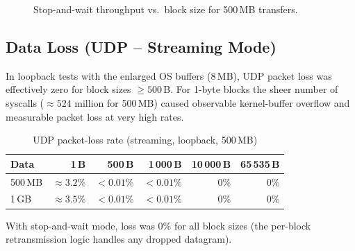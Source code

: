 \documentclass[12pt,a4paper]{article}
\begin{document}
\begin{figure}[H]
\centering
{}
\caption{Stop-and-wait throughput vs.\ block size for 500\,MB transfers.}
\label{fig:saw500}
\end{figure}

\subsection{Data Loss (UDP – Streaming Mode)}
\label{ssec:loss}

In loopback tests with the enlarged OS buffers (8\,MB), UDP packet loss was
effectively zero for block sizes $\geq 500$\,B. For 1-byte blocks the sheer
number of syscalls ($\approx 524$ million for 500\,MB) caused observable
kernel-buffer overflow and measurable packet loss at very high rates.

\begin{table}[H]
\centering
\caption{UDP packet-loss rate (streaming, loopback, 500\,MB)}
\label{tab:udploss}
\begin{tabular}{lrrrrr}
\toprule
\textbf{Data} &
\textbf{1\,B} &
\textbf{500\,B} &
\textbf{1\,000\,B} &
\textbf{10\,000\,B} &
\textbf{65\,535\,B} \\
\midrule
500\,MB & $\approx 3.2\%$ & $<0.01\%$ & $<0.01\%$ & 0\% & 0\% \\
1\,GB   & $\approx 3.5\%$ & $<0.01\%$ & $<0.01\%$ & 0\% & 0\% \\
\bottomrule
\end{tabular}
\end{table}

With stop-and-wait mode, loss was 0\% for all block sizes (the per-block
retransmission logic handles any dropped datagram).
\end{document}
